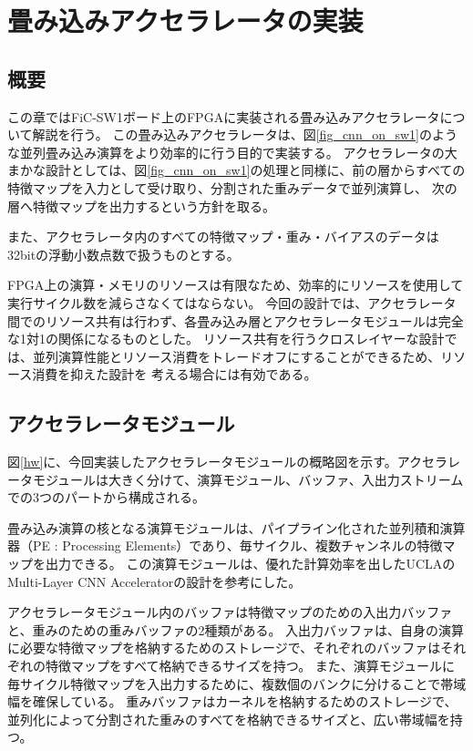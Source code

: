 \chapter{畳み込みアクセラレータの実装}
\section{概要}
この章ではFiC-SW1ボード上のFPGAに実装される畳み込みアクセラレータについて解説を行う。
この畳み込みアクセラレータは、図\ref{fig_cnn_on_sw1}のような並列畳み込み演算をより効率的に行う目的で実装する。
アクセラレータの大まかな設計としては、図\ref{fig_cnn_on_sw1}の処理と同様に、前の層からすべての特徴マップを入力として受け取り、分割された重みデータで並列演算し、
次の層へ特徴マップを出力するという方針を取る。

また、アクセラレータ内のすべての特徴マップ・重み・バイアスのデータは32bitの浮動小数点数で扱うものとする。

FPGA上の演算・メモリのリソースは有限なため、効率的にリソースを使用して実行サイクル数を減らさなくてはならない。
今回の設計では、アクセラレータ間でのリソース共有は行わず、各畳み込み層とアクセラレータモジュールは完全な1対1の関係になるものとした。
リソース共有を行うクロスレイヤーな設計では、並列演算性能とリソース消費をトレードオフにすることができるため、リソース消費を抑えた設計を
考える場合には有効である。

\section{アクセラレータモジュール}
図\ref{hw}に、今回実装したアクセラレータモジュールの概略図を示す。アクセラレータモジュールは大きく分けて、演算モジュール、バッファ、入出力ストリームでの3つのパートから構成される。

畳み込み演算の核となる演算モジュールは、パイプライン化された並列積和演算器（PE : Processing Elements）であり、毎サイクル、複数チャンネルの特徴マップを出力できる。
この演算モジュールは、優れた計算効率を出したUCLAのMulti-Layer CNN Accelerator\cite{fpgaopt}の設計を参考にした。

アクセラレータモジュール内のバッファは特徴マップのための入出力バッファと、重みのための重みバッファの2種類がある。
入出力バッファは、自身の演算に必要な特徴マップを格納するためのストレージで、それぞれのバッファはそれぞれの特徴マップをすべて格納できるサイズを持つ。
また、演算モジュールに毎サイクル特徴マップを入出力するために、複数個のバンクに分けることで帯域幅を確保している。
重みバッファはカーネルを格納するためのストレージで、並列化によって分割された重みのすべてを格納できるサイズと、広い帯域幅を持つ。


